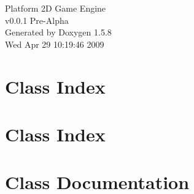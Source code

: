 \documentclass[a4paper]{book}
\begin{document}
\begin{titlepage}
\vspace*{7cm}
\begin{center}
{\Large Platform 2D Game Engine \\[1ex]\large v0.0.1 Pre-Alpha }\\
\vspace*{1cm}
{\large Generated by Doxygen 1.5.8}\\
\vspace*{0.5cm}
{\small Wed Apr 29 10:19:46 2009}\\
\end{center}
\end{titlepage}
\clearemptydoublepage
{}
\tableofcontents
\clearemptydoublepage
{}
\chapter{Class Index}

\chapter{Class Index}

\chapter{Class Documentation}






\printindex
\end{document}
